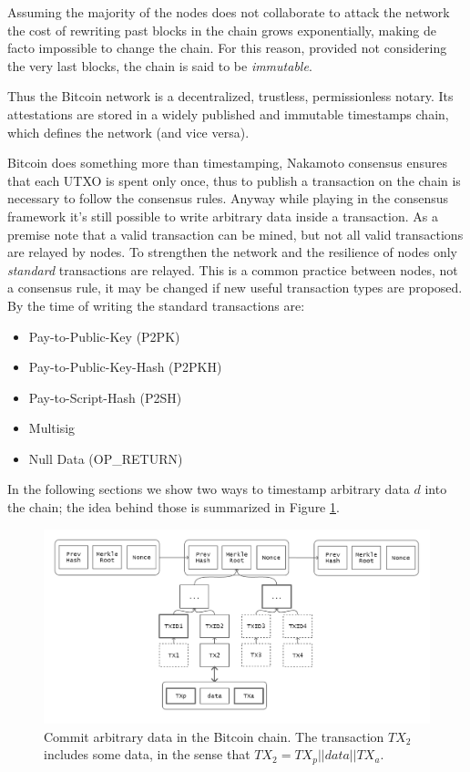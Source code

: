 Assuming the majority of the nodes does not collaborate to attack the network the cost of rewriting past blocks in the chain grows exponentially, making de facto impossible to change the chain. For this reason, provided not considering the very last blocks, the chain is said to be \textit{immutable}. 

Thus the Bitcoin network is a decentralized, trustless, permissionless notary. Its attestations are stored in a widely published and immutable timestamps chain, which defines the network (and vice versa). 

Bitcoin does something more than timestamping, Nakamoto consensus ensures that each UTXO is spent only once, thus to publish a transaction on the chain is necessary to follow the consensus rules. 
Anyway while playing in the consensus framework it's still possible to write arbitrary data inside a transaction.
As a premise note that a valid transaction can be mined, but not all valid transactions are relayed by nodes. To strengthen the network and the resilience of nodes only \textit{standard} transactions are relayed. This is a common practice between nodes, not a consensus rule, it may be changed if new useful transaction types are proposed. By the time of writing the standard transactions are:
\begin{itemize}
	\item Pay-to-Public-Key (P2PK)
	\item Pay-to-Public-Key-Hash (P2PKH)
	\item Pay-to-Script-Hash (P2SH)
	\item Multisig
	\item Null Data (OP\_RETURN)
\end{itemize}

In the following sections we show two ways to timestamp arbitrary data $d$ into the chain; the idea behind those is summarized in Figure \ref{fig:chain-data}.

\begin{figure}
	\begin{center}
		\includegraphics[width=\linewidth]{Images/bitcoin-chain-data-path.png}
		\caption[Commit arbitrary data in the Bitcoin chain.]{Commit arbitrary data in the Bitcoin chain. The transaction $TX_2$ includes some data, in the sense that $TX_2=TX_p||data||TX_a$.}
		\label{fig:chain-data}
	\end{center}
\end{figure}

